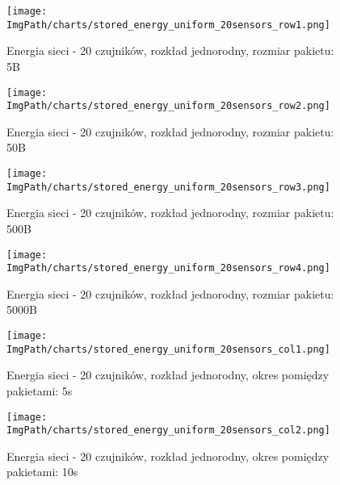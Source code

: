 \begin{figure}[H]
	\begin{center}
		\texttt{[image: \\ImgPath/charts/stored\_energy\_uniform\_20sensors\_row1.png]}
	\end{center}
	\caption{Energia sieci - 20 czujników, rozkład jednorodny, rozmiar pakietu: 5B}
\end{figure}

\begin{figure}[H]
	\begin{center}
		\texttt{[image: \\ImgPath/charts/stored\_energy\_uniform\_20sensors\_row2.png]}
	\end{center}
	\caption{Energia sieci - 20 czujników, rozkład jednorodny, rozmiar pakietu: 50B}
\end{figure}

\begin{figure}[H]
	\begin{center}
		\texttt{[image: \\ImgPath/charts/stored\_energy\_uniform\_20sensors\_row3.png]}
	\end{center}
	\caption{Energia sieci - 20 czujników, rozkład jednorodny, rozmiar pakietu: 500B}
\end{figure}

\begin{figure}[H]
	\begin{center}
		\texttt{[image: \\ImgPath/charts/stored\_energy\_uniform\_20sensors\_row4.png]}
	\end{center}
	\caption{Energia sieci - 20 czujników, rozkład jednorodny, rozmiar pakietu: 5000B}
\end{figure}

\begin{figure}[H]
	\begin{center}
		\texttt{[image: \\ImgPath/charts/stored\_energy\_uniform\_20sensors\_col1.png]}
	\end{center}
	\caption{Energia sieci - 20 czujników, rozkład jednorodny, okres pomiędzy pakietami: 5s}
\end{figure}

\begin{figure}[H]
	\begin{center}
		\texttt{[image: \\ImgPath/charts/stored\_energy\_uniform\_20sensors\_col2.png]}
	\end{center}
	\caption{Energia sieci - 20 czujników, rozkład jednorodny, okres pomiędzy pakietami: 10s}
\end{figure}

